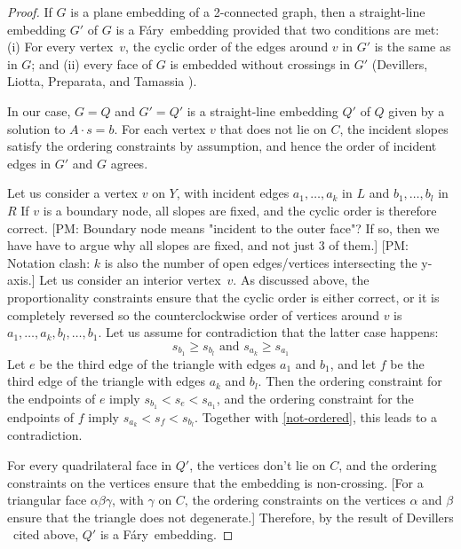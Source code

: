 \documentclass{patmorin}
\newcommand{\Fary}{Fáry}
\begin{document}
\begin{proof}
   If $G$ is a plane embedding of a 2-connected graph, then a
   straight-line embedding $G'$ of $G$ is a \Fary\ embedding provided
   that two conditions are met:
(i) For every vertex~$v$, the cyclic order of the
   edges around $v$ in $G'$ is the same as in $G$; and
(ii) every face of $G$ is embedded without crossings in $G'$
(Devillers, Liotta, Preparata, and Tamassia \cite[Lemma~16]{devillers.liotta.ea:checking}).

In our case, $G=Q$ and $G'=Q'$ is a straight-line embedding $Q'$ of
$Q$ given by a solution to $A\cdot s = b$.  For each vertex $v$ that
does not lie on $C$, the incident slopes satisfy the ordering constraints
by assumption, and hence the order of incident edges in $G'$ and $G$
agrees.

Let us consider a vertex $v$ on $Y$, with incident edges $a_1,\ldots,a_k$
in $L$ and $b_1,\ldots,b_l$ in $R$ If $v$ is a boundary node, all slopes
are fixed, and the cyclic order is therefore correct. [PM: Boundary node
means "incident to the outer face"?  If so, then we have have to argue
why all slopes are fixed, and not just 3 of them.] [PM: Notation clash: $k$ is also the number of open edges/vertices intersecting the y-axis.]  Let us consider an
interior vertex~$v$.
%
 As discussed above, the proportionality constraints ensure that
the cyclic order is either correct, or it is completely reversed so the counterclockwise order of vertices around $v$ is $a_1,\ldots,a_k,b_l,\ldots,b_1$.
Let us assume for contradiction that the latter case happens:
\begin{equation}
  \label{eq:not-ordered}
s_{b_1}\ge s_{b_l}
\text{ and }
s_{a_k}\ge s_{a_1}
\end{equation}
Let $e$ be the third edge of the triangle with edges $a_1$ and $b_1$,
and let 
 $f$ be the third edge of the triangle with edges $a_k$ and $b_l$.
Then the ordering constraint for the endpoints of $e$ imply
\begin{math}
  s_{b_1}<s_e<s_{a_1}
\end{math},
and the ordering constraint for the endpoints of $f$ imply
\begin{math}
  s_{a_k}<s_f<s_{b_l}
\end{math}.
Together with \eqref{not-ordered}, this leads to a contradiction.

   For every quadrilateral face in $Q'$, the vertices don't lie on
   $C$, and the ordering constraints on the vertices
   ensure that the embedding is non-crossing.
[For a triangular face $\alpha\beta\gamma$, with $\gamma$ on
$C$,
 the ordering constraints on the vertices $\alpha$ and $\beta$
   ensure that the triangle does not degenerate.]
   Therefore, by the result
of Devillers \etal\
   cited above, $Q'$ is a \Fary\ embedding. %
\end{proof}
\end{document}
